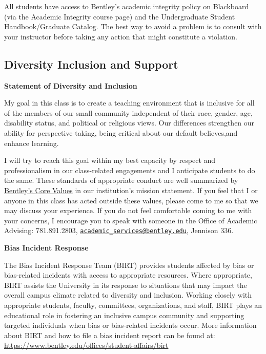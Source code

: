 \documentclass[
]{book}
\begin{document}
All students have access to Bentley's academic integrity policy on Blackboard (via the Academic Integrity course page) and the Undergraduate Student Handbook/Graduate Catalog. The best way to avoid a problem is to consult with your instructor before taking any action that might constitute a violation.

\hypertarget{diversity-inclusion-and-support}{%
\subsection*{Diversity Inclusion and Support}\label{diversity-inclusion-and-support}}

\textbf{Statement of Diversity and Inclusion}

My goal in this class is to create a teaching environment that is inclusive for all of the members of our small community independent of their race, gender, age, disability status, and political or religious views. Our differences strengthen our ability for perspective taking, being critical about our default believes,and enhance learning.

I will try to reach this goal within my best capacity by respect and professionalism in our class-related engagements and I anticipate students to do the same. These standards of appropriate conduct are well summarized by \href{https://www.bentley.edu/about/mission-and-values}{Bentley's Core Values} in our institution's mission statement. If you feel that I or anyone in this class has acted outside these values, please come to me so that we may discuss your experience. If you do not feel comfortable coming to me with your concerns, I encourage you to speak with someone in the Office of Academic Advising: 781.891.2803, \href{mailto:academic_services@bentley.edu}{\nolinkurl{academic\_services@bentley.edu}}, Jennison 336.

\textbf{Bias Incident Response}

The Bias Incident Response Team (BIRT) provides students affected by bias or bias-related incidents with access to appropriate resources. Where appropriate, BIRT assists the University in its response to situations that may impact the overall campus climate related to diversity and inclusion. Working closely with appropriate students, faculty, committees, organizations, and staff, BIRT plays an educational role in fostering an inclusive campus community and supporting targeted individuals when bias or bias-related incidents occur. More information about BIRT and how to file a bias incident report can be found at: \url{https://www.bentley.edu/offices/student-affairs/birt}
\end{document}
